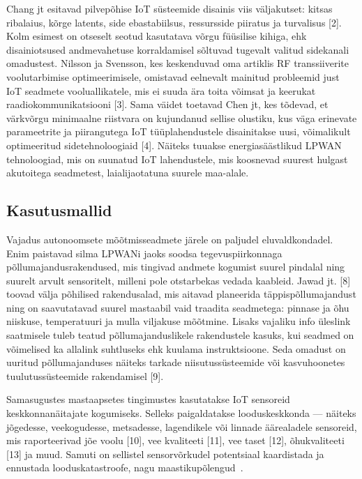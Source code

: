 \documentclass[12pt]{article}
\begin{document}
Chang jt esitavad pilvepõhise IoT süsteemide disainis viis väljakutset: kitsas ribalaius, kõrge latents, side ebastabiilsus, ressursside piiratus ja turvalisus [2].
Kolm esimest on otseselt seotud kasutatava võrgu füüsilise kihiga, ehk disainiotsused andmevahetuse korraldamisel sõltuvad tugevalt valitud sidekanali omadustest.
Nilsson ja Svensson, kes keskenduvad oma artiklis RF transsiiverite voolutarbimise optimeerimisele, omistavad eelnevalt mainitud probleemid just IoT seadmete vooluallikatele, mis ei suuda ära toita võimsat ja keerukat raadiokommunikatsiooni [3].
Sama väidet toetavad Chen jt, kes tõdevad, et värkvõrgu minimaalne riistvara on kujundanud sellise olustiku, kus väga erinevate parameetrite ja piirangutega IoT tüüplahendustele disainitakse uusi, võimalikult optimeeritud sidetehnoloogiaid [4].
Näiteks tuuakse energiasäästlikud LPWAN tehnoloogiad, mis on suunatud IoT lahendustele, mis koosnevad suurest hulgast akutoitega seadmetest, laialijaotatuna suurele maa-alale.

\subsection{Kasutusmallid}

Vajadus autonoomsete mõõtmisseadmete järele on paljudel eluvaldkondadel. Enim paistavad silma LPWANi jaoks soodsa tegevuspiirkonnaga põllumajandusrakendused, mis tingivad andmete kogumist suurel pindalal ning suurelt arvult sensoritelt, milleni pole otstarbekas vedada kaableid.
Jawad jt. [8] toovad välja põhilised rakendusalad, mis aitavad planeerida täppispõllumajandust ning on saavutatavad suurel mastaabil vaid traadita seadmetega: pinnase ja õhu niiskuse, temperatuuri ja mulla viljakuse mõõtmine.
Lisaks vajaliku info üleslink saatmisele tuleb teatud põllumajanduslikele rakendustele kasuks, kui seadmed on võimelised ka allalink suhtluseks ehk kuulama instruktsioone.
Seda omadust on uuritud põllumajanduses näiteks tarkade niisutussüsteemide või kasvuhoonetes tuulutussüsteemide rakendamisel [9].

Samasugustes mastaapsetes tingimustes kasutatakse IoT sensoreid keskkonnanäitajate kogumiseks.
Selleks paigaldatakse looduskeskkonda — näiteks jõgedesse, veekogudesse, metsadesse, lagendikele või linnade äärealadele sensoreid, mis raporteerivad jõe voolu [10], vee kvaliteeti [11], vee taset [12], õhukvaliteeti [13] ja muud.
Samuti on sellistel sensorvõrkudel potentsiaal kaardistada ja ennustada looduskatastroofe, nagu  maastikupõlengud~\cite{kang}.
\end{document}
